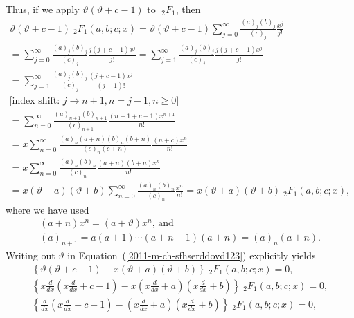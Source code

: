 {Thus, if we apply  $\vartheta (\vartheta +c-1)$ to ${\;}_2F_1$, then
\begin{equation}
\begin{split}
\vartheta (\vartheta +c-1) {\;}_2F_1 (a,b;c;x)
=  \vartheta (\vartheta +c-1) \sum_{j=0}^\infty  \frac{( a)_j( b)_j}{(c)_j} \frac{x^j}{j!}
\\
=   \sum_{j=0}^\infty  \frac{( a)_j( b)_j}{(c)_j} \frac{j(j+c-1)x^j}{j!}
=   \sum_{j=1}^\infty  \frac{( a)_j( b)_j}{(c)_j} \frac{j(j+c-1)x^j}{j!}
\\
=   \sum_{j=1}^\infty  \frac{( a)_j( b)_j}{(c)_j} \frac{ (j+c-1)x^j}{(j-1)!}
\\
\textrm{[index shift: } j\rightarrow n+1, n=j-1, n\ge 0\textrm{]}
\\
=   \sum_{n=0}^\infty  \frac{( a)_{n+1}( b)_{n+1}}{(c)_{n+1}} \frac{ ({n+1}+c-1)x^{n+1}}{n!}
\\
=  x \sum_{n=0}^\infty  \frac{( a)_{n}(a+n)( b)_{n}(b+n)}{(c)_{n}(c+n)} \frac{ ({n }+c)x^{n}}{n!}
\\
=  x\sum_{n=0}^\infty  \frac{( a)_{n}( b)_{n}}{(c)_{n}} \frac{(a+n) (b+n)x^{n}}{n!}
\\
=   x(\vartheta +a)(\vartheta +b)  \sum_{n=0}^\infty  \frac{( a)_{n}( b)_{n}}{(c)_{n}} \frac{x^{n}}{n!}
=   x(\vartheta +a)(\vartheta +b)  {\;}_2F_1(a,b;c;x)
,
\end{split}
\label{2011-m-ch-sfhserddovd123}
\end{equation}
where we have used
\begin{equation}
\begin{split}
(a+n)x^n = (a+ \vartheta )x^n \text{, and}   \\
(a)_{n+1}=a(a+1)\cdots (a+n-1)(a+n) =  (a)_{n}(a+n).
\end{split}
\end{equation}
Writing out $\vartheta$ in  Equation~(\ref{2011-m-ch-sfhserddovd123}) explicitly yields
\begin{equation}
\begin{split}
\left\{\vartheta (\vartheta +c-1)  -   x(\vartheta +a)(\vartheta +b)\right\}  {\;}_2F_1(a,b;c;x) =0,
   \\
\left\{x \frac{d}{dx} \left(x \frac{d}{dx} +c-1\right)    -   x\left(x \frac{d}{dx}+a\right)\left(x \frac{d}{dx} +b\right) \right\}  {\;}_2F_1(a,b;c;x) =0,
   \\
\left\{ \frac{d}{dx} \left(x \frac{d}{dx} +c-1\right)    -    \left(x \frac{d}{dx}+a\right)\left(x \frac{d}{dx} +b\right) \right\}  {\;}_2F_1(a,b;c;x) =0,
   \\

\end{split}
\end{equation}}
